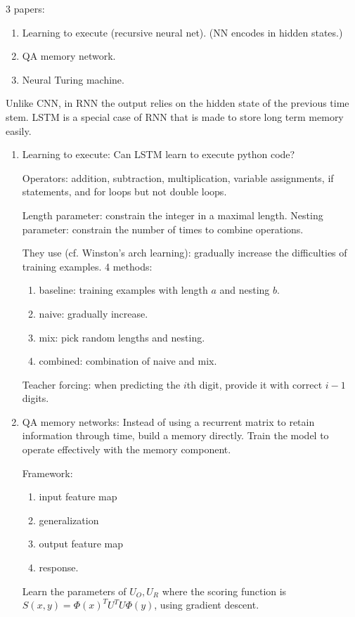 3 papers: 
\begin{enumerate}
\item
Learning to execute (recursive neural net). (NN encodes in hidden states.)
\item
QA memory network. 
\item
Neural Turing machine.
\end{enumerate}

Unlike CNN, in RNN the output relies on the hidden state of the previous time stem. LSTM is a special case of RNN that is made to store long term memory easily.


\begin{enumerate}
\item
Learning to execute: Can LSTM learn to execute python code?

Operators: addition, subtraction, multiplication, variable assignments, if statements, and for loops but not double loops.

Length parameter: constrain the integer in a maximal length. Nesting parameter: constrain the number of times to combine operations.  

They use  (cf. Winston's arch learning): gradually increase the difficulties of training examples. 4 methods:
\begin{enumerate}
\item baseline: training examples with length $a$ and nesting $b$.
\item naive: gradually increase.
\item mix: pick random lengths and nesting.
\item combined: combination of naive and mix.
\end{enumerate}
Teacher forcing: when predicting the $i$th digit, provide it with correct $i-1$ digits. 
\item QA memory networks: Instead of using a recurrent matrix to retain information through time, build a memory directly. Train the model to operate effectively with the memory component.

Framework:
\begin{enumerate}
\item
input feature map
\item generalization
\item output feature map
\item response.
\end{enumerate}
Learn the parameters of $U_O,U_R$ where the scoring function is $S(x,y)=\Phi(x)^TU^TU\Phi(y)$, using gradient descent.


\end{enumerate}
